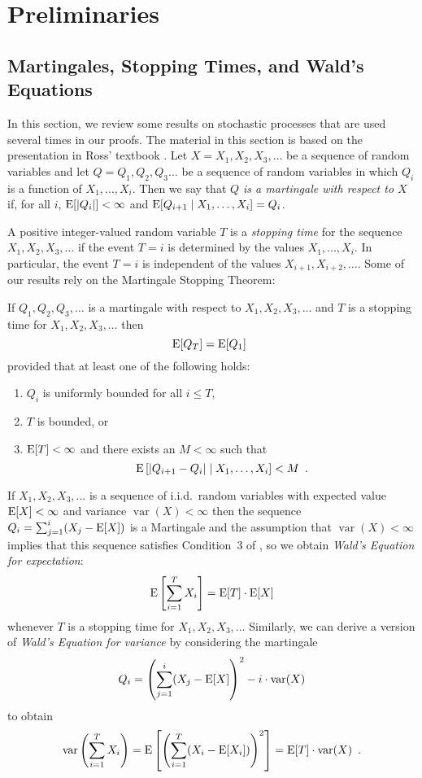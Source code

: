 \documentclass[acmtoalg]{acmtrans2m}
\DeclareMathOperator{\var}{var}
\begin{document}
\section{Preliminaries}

\subsection{Martingales, Stopping Times, and Wald's Equations}

In this section, we review some results on stochastic processes that
are used several times in our proofs.  The material in this section is
based on the presentation in Ross' textbook \cite[Chapter 6]{ross}.
Let $X=X_1,X_2,X_3,\ldots$ be a sequence of random variables and let
$Q=Q_1,Q_2,Q_3\ldots$ be a sequence of random variables in which $Q_i$
is a function of $X_1,\ldots,X_i$.  Then we say that \emph{$Q$ is a
martingale with respect to $X$} if, for all $i$, $\mathrm{E}[|Q_i|] < \infty$
and $\mathrm{E}[Q_{i+1}\mid X_1,\ldots,X_i] = Q_i$.

A positive integer-valued random variable $T$ is a \emph{stopping
time} for the sequence $X_1,X_2,X_3,\ldots$ if the event $T=i$ is
determined by the values $X_1,\ldots,X_i$.  In particular, the event
$T=i$ is independent of the values $X_{i+1},X_{i+2},\ldots$.  Some of
our results rely on the Martingale Stopping Theorem:

\begin{thm}
If $Q_1,Q_2,Q_3,\ldots$ is a martingale with respect to
$X_1,X_2,X_3,\ldots$ and $T$ is a stopping time for
$X_1,X_2,X_3,\ldots$ then
\[
   \mathrm{E}[Q_T] = \mathrm{E}[Q_1] \enspace 
\]
provided that at least one of the following holds:
\begin{enumerate}
\item $Q_i$ is uniformly bounded for all $i\le T$,
\item $T$ is bounded, or
\item $\mathrm{E}[T] < \infty$ and there exists an $M<\infty$ such that
\[ \mathrm{E}\left[|Q_{i+1}-Q_i| \mid X_1,\ldots,X_i \right] < M  \enspace . \]
\end{enumerate}
\end{thm}

If $X_1,X_2,X_3,\ldots$ is a sequence of i.i.d.\ random variables with
expected value $\mathrm{E}[X]<\infty$ and variance $\var(X)<\infty$ then 
the sequence $Q_i=\sum_{j=1}^i(X_j-\mathrm{E}[X])$ is a Martingale and the
assumption that $\var(X)<\infty$ implies that this sequence satisfies
Condition~3 of , so we obtain \emph{Wald's Equation
for expectation}:
\begin{equation}
    \E\left[\sum_{i=1}^T X_i \right] = \E[T]\cdot\E[X] \eqlabel{wald-1}
\end{equation}
whenever $T$ is a stopping time for $X_1,X_2,X_3,\ldots$  Similarly,
we can derive a version of \emph{Wald's Equation for variance} by considering 
the martingale 
\[
   Q_i=\left(\sum_{j=1}^i (X_j-\E[X]\right)^2 - i\cdot\var(X)
\]
to obtain
\begin{equation}
    \var\left(\sum_{i=1}^T X_i\right) = \E\left[\left(\sum_{i=1}^T (X_i-\E[X_i])\right)^2 \right] =
\E[T]\cdot\var(X) \enspace . \eqlabel{wald-2}
\end{equation}
\end{document}
